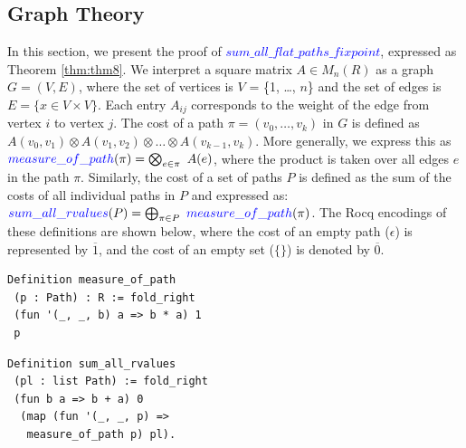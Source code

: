 \documentclass[a4paper,UKenglish,cleveref, autoref, thm-restate, anonymous]{lipics-v2021}
\begin{document}
\subsection{Graph Theory}\label{sec:graph} 
In this section, we present the proof of \textcolor{blue}{$sum\_all\_flat\_paths\_fixpoint$}, 
expressed as Theorem \ref{thm:thm8}. 
We interpret a square matrix $A \in M_{n}(R)$ as a graph \( G = (V, E) \), where the set of vertices is \( V \) = \{1, \ldots, $n$\} and the set of edges is \( E = \{x \in V \times V\}\). Each entry $A_{ij}$ corresponds to the weight of the edge from vertex $i$ to vertex $j$. The cost of a path \(\pi = (v_0, \ldots, v_k)\) in $G$ is defined as $A(v_0, v_1)\otimes A(v_1, v_2) \otimes \ldots \otimes A(v_{k-1}, v_{k})$. More generally, we express this as $\textcolor{blue}{measure\_of\_path}(\pi) = \bigotimes_{e \in \pi} \text{ }A(e)$, where the product is taken over all edges $e$ in the path $\pi$.
Similarly, the cost of a set of paths $P$ is defined as the sum of the costs of all individual paths in $P$ and  expressed as: $ \textcolor{blue}{sum\_all\_rvalues} (P) = 
  \bigoplus_{\pi \in P} \text{ } \textcolor{blue}{measure\_of\_path} (\pi)$. The Rocq encodings of these definitions are shown below, where the cost of an empty path (\(\epsilon\)) is represented by \(\overline{1}\), and the cost of an empty set (\(\{\}\)) is denoted by \(\overline{0}\).

\vspace{2mm}
\begin{minipage}[t]{0.48\linewidth}
\begin{lstlisting}[language=Coq]
Definition measure_of_path 
 (p : Path) : R := fold_right 
 (fun '(_, _, b) a => b * a) 1 
 p
\end{lstlisting}
\end{minipage}
\hspace{3mm}
\begin{minipage}[t]{0.45\linewidth}{\vspace{-2mm}}
\begin{lstlisting}[language=Coq]
Definition sum_all_rvalues 
 (pl : list Path) := fold_right 
 (fun b a => b + a) 0 
  (map (fun '(_, _, p) => 
   measure_of_path p) pl).
    \end{lstlisting} 
  \end{minipage}
 \vspace{4mm} 
\end{document}

